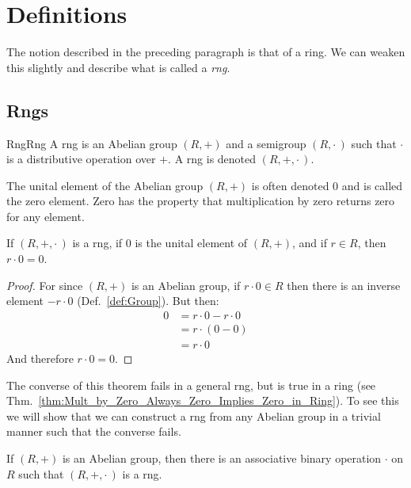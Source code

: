 \section{Definitions}
    The notion described in the preceding paragraph is that of a \gls{ring}. We
    can weaken this slightly and describe what is called a \textit{rng}.
    \subsection{Rngs}
        \begin{fdefinition}{Rng}{Rng}
            A \gls{rng} is an \gls{Abelian group} $(R,+)$ and a \gls{semigroup}
            $(R,\cdot\,)$ such that $\cdot$ is a \gls{distributive operation}
            over $+$. A rng is denoted $(R,+,\cdot\,)$.
        \end{fdefinition}
        The unital element of the Abelian group $(R,+)$ is often denoted 0 and
        is called the zero element. Zero has the property that multiplication by
        zero returns zero for any element.
        \begin{theorem}
            \label{thm:Mult_By_Zero_in_Rng}%
            If $(R,+,\cdot\,)$ is a rng, if 0 is the unital element of $(R,+)$,
            and if $r\in{R}$, then $r\cdot{0}=0$.
        \end{theorem}
        \begin{proof}
            For since $(R,+)$ is an Abelian group, if $r\cdot{0}\in{R}$ then
            there is an inverse element $\minus{r}\cdot{0}$
            (Def.~\ref{def:Group}). But then:
            \begin{align}
                0&=r\cdot{0}-r\cdot{0}
                \tag{Inverse Property of Groups}\\
                &=r\cdot(0-0)
                \tag{Distributive Property}\\
                &=r\cdot{0}
                \tag{Identity Property}
            \end{align}
            And therefore $r\cdot{0}=0$.
        \end{proof}
        The converse of this theorem fails in a general rng, but is true in a
        ring (see Thm.~\ref{thm:Mult_by_Zero_Always_Zero_Implies_Zero_in_Ring}).
        To see this we will show that we can construct a rng from any Abelian
        group in a trivial manner such that the converse fails.
        \begin{theorem}
            \label{thm:rng_induced_by_Abelian_group}%
            If $(R,+)$ is an Abelian group, then there is an associative
            binary operation $\cdot$ on $R$ such that $(R,+,\cdot\,)$ is a rng.
        \end{theorem}
